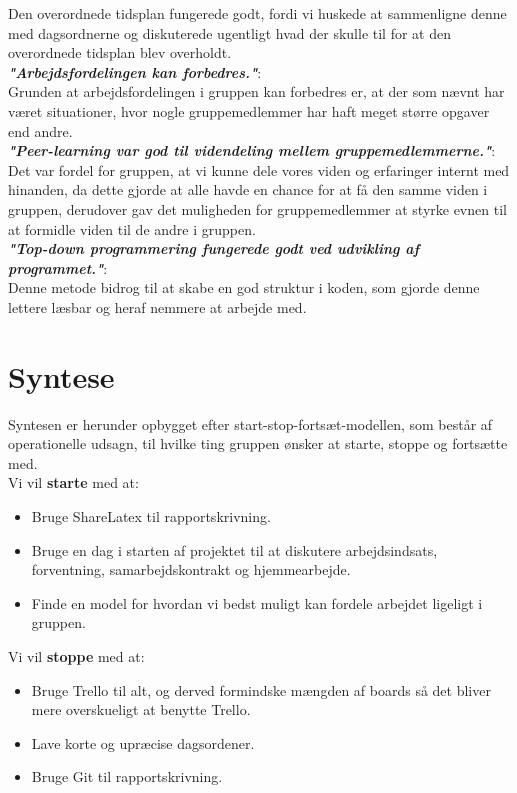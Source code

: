 \documentclass[oneside,a4paper,titlepage]{article}
\begin{document}
Den overordnede tidsplan fungerede godt, fordi vi huskede at sammenligne denne med dagsordnerne og diskuterede ugentligt hvad der skulle til for at den overordnede tidsplan blev overholdt.  \\

\textbf{\textit{"Arbejdsfordelingen kan forbedres."}}: \\

Grunden at arbejdsfordelingen i gruppen kan forbedres er, at der som nævnt har været situationer, hvor nogle gruppemedlemmer har haft meget større opgaver end andre.  \\

\textbf{\textit{"Peer-learning var god til videndeling mellem gruppemedlemmerne."}}: \\

Det var fordel for gruppen, at vi kunne dele vores viden og erfaringer internt med hinanden, da dette gjorde at alle havde en chance for at få den samme viden i gruppen, derudover gav det muligheden for gruppemedlemmer at styrke evnen til at formidle viden til de andre i gruppen. \\

\textbf{\textit{"Top-down programmering fungerede godt ved udvikling af programmet."}}: \\

Denne metode bidrog til at skabe en god struktur i koden, som gjorde denne lettere læsbar og heraf nemmere at arbejde med.


\section{Syntese}
Syntesen er herunder opbygget efter start-stop-fortsæt-modellen, som består af operationelle udsagn, til hvilke ting gruppen ønsker at starte, stoppe og fortsætte med.\\

Vi vil \textbf{starte} med at:
\begin{itemize}
  \item Bruge ShareLatex til rapportskrivning. 
  \item Bruge en dag i starten af projektet til at diskutere arbejdsindsats, forventning, samarbejdskontrakt og hjemmearbejde. 
  \item Finde en model for hvordan vi bedst muligt kan fordele arbejdet ligeligt i gruppen.  
\end{itemize}


Vi vil \textbf{stoppe} med at:
\begin{itemize}
  \item Bruge Trello til alt, og derved formindske mængden af boards så det bliver mere overskueligt at benytte Trello.
  \item Lave korte og upræcise dagsordener.
  \item Bruge Git til rapportskrivning.
\end{itemize}
\end{document}

